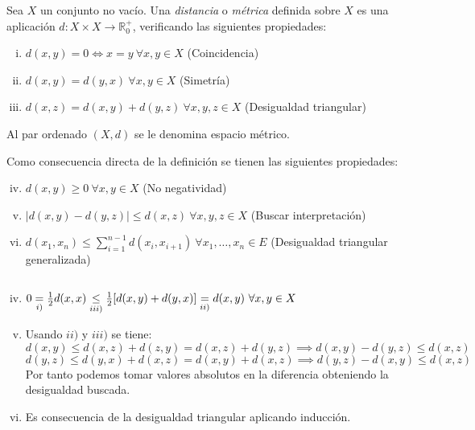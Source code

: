 \documentclass[ oneside,openany,titlepage,numbers=noenddot,headinclude,%
                footinclude=true,cleardoublepage=empty,abstractoff, %
                BCOR=5mm,paper=a4,fontsize=11pt,%
                spanish,american%
                ]{scrreprt}
\begin{document}
\begin{definition}[Distancia]
	Sea $X$ un conjunto no vacío. Una \emph{distancia} o \emph{métrica} definida sobre $X$ es una aplicación $d:X\times X \to \mathbb{R}^{+}_{0}$, verificando las siguientes propiedades:
	
	\begin{enumerate}[i)]
		\item $d(x,y)=0  \iff x = y \ \forall x,y \in X$ (Coincidencia)
		\item $d(x,y)=d(y,x) \ \forall x,y \in X$ (Simetría)
		\item $d(x,z)=d(x,y)+d(y,z) \ \forall x,y,z \in X$ (Desigualdad triangular)
	\end{enumerate}
	
	Al par ordenado $(X,d)$ se le denomina espacio métrico.
\end{definition}

\remb
Como consecuencia directa de la definición se tienen las siguientes propiedades:

\begin{enumerate}[i)]
	\setcounter{enumi}{3}
	\item $d(x,y) \ge 0 \ \forall x,y \in X$ (No negatividad)
	\item $|d(x,y)-d(y,z)| \le d(x,z) \ \forall x,y,z \in X$ (Buscar interpretación)
	\item $d(x_1,x_n) \le \sum_{i=1}^{n-1}d(x_i,x_{i+1}) \ \forall x_1,\dots,x_n \in E$ (Desigualdad triangular generalizada)
\end{enumerate}

\proofb
 $ $\newline
	\begin{enumerate}[i)]
		\setcounter{enumi}{3}
		\item $ 0 \underset{i)}{=} \frac{1}{2}d(x,x) \underset{iii)}{\le}\frac{1}{2}[d(x,y)+d(y,x)]\underset{ii)}{=}d(x,y) \ \forall x,y \in X$
		
		\item Usando $ii)$ y $iii)$ se tiene:
		\[d(x,y) \le d(x,z) + d(z,y) = d(x,z)+d(y,z) \implies d(x,y)-d(y,z)\le d(x,z)\]
		\[d(y,z) \le d(y,x) + d(x,z) = d(x,y)+d(x,z) \implies d(y,z)-d(x,y)\le d(x,z) \]
		Por tanto podemos tomar valores absolutos en la diferencia obteniendo la desigualdad buscada.
		
		\item Es consecuencia de la desigualdad triangular aplicando inducción.
	\end{enumerate}
\proofe

\reme
\end{document}
